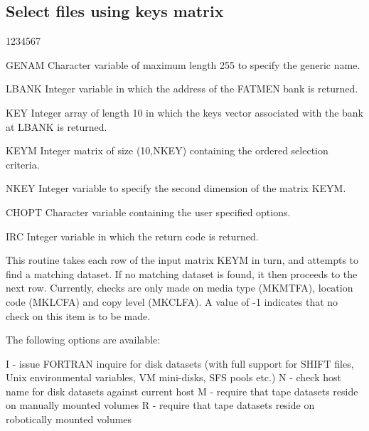 \subsection{Select files using keys matrix}
\begin{DLtt}{1234567}
\item[GENAM]
Character variable of maximum length 255 to specify the generic name.
\item[LBANK]
Integer variable in which the address of the FATMEN bank is returned.
\item[KEY]
Integer array of length 10 in which the keys vector associated with
the bank at LBANK is returned.
\item[KEYM]
Integer matrix of size (10,NKEY) containing the ordered selection
criteria.
\item[NKEY]
Integer variable to specify the second dimension of
the matrix KEYM.
\item[CHOPT]
Character variable containing the user specified options.
\item[IRC]
Integer variable in which the return code is returned.
\end{DLtt}
\par
This routine takes each row of the input matrix KEYM in turn,
and attempts to find a matching dataset. If no matching dataset
is found, it then proceeds to the next row.
Currently, checks are only made on media type (MKMTFA), location code
(MKLCFA) and copy level (MKCLFA). A value of -1 indicates that no
check on this item is to be made.
\par
The following options are available:
\begin{XMP}
   I - issue FORTRAN inquire for disk datasets (with full support
       for SHIFT files, Unix environmental variables, VM mini-disks,
       SFS pools etc.)
   N - check host name for disk datasets against current host
   M - require that tape datasets reside on manually mounted volumes
   R - require that tape datasets reside on robotically mounted volumes
\end{XMP}
